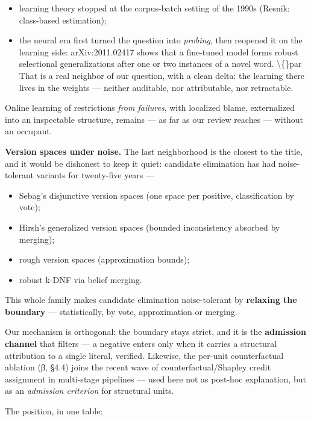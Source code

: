 \documentclass[11pt]{article}
\begin{document}
\begin{itemize}
\item learning theory stopped at the corpus-batch setting of the 1990s (Resnik; class-based estimation);
\item the neural era first turned the question into \emph{probing}, then reopened it on the learning side: arXiv:2011.02417 shows that a fine-tuned model forms robust selectional generalizations after one or two instances of a novel word. \textbackslash\{\}par That is a real neighbor of our question, with a clean delta: the learning there lives in the weights — neither auditable, nor attributable, nor retractable.
\end{itemize}

Online learning of restrictions \emph{from failures}, with localized blame, externalized into an inspectable structure, remains — as far as our review reaches — without an occupant.

\textbf{Version spaces under noise.} The last neighborhood is the closest to the title, and it would be dishonest to keep it quiet: candidate elimination has had noise-tolerant variants for twenty-five years —

\begin{itemize}
\item Sebag's disjunctive version spaces (one space per positive, classification by vote);
\item Hirsh's generalized version spaces (bounded inconsistency absorbed by merging);
\item rough version spaces (approximation bounds);
\item robust k-DNF via belief merging.
\end{itemize}

This whole family makes candidate elimination noise-tolerant by \textbf{relaxing the boundary} — statistically, by vote, approximation or merging.

Our mechanism is orthogonal: the boundary stays strict, and it is the \textbf{admission channel} that filters — a negative enters only when it carries a structural attribution to a single literal, verified. Likewise, the per-unit counterfactual ablation (β, §4.4) joins the recent wave of counterfactual/Shapley credit assignment in multi-stage pipelines — used here not as post-hoc explanation, but as an \emph{admission criterion} for structural units.

The position, in one table:
\end{document}
